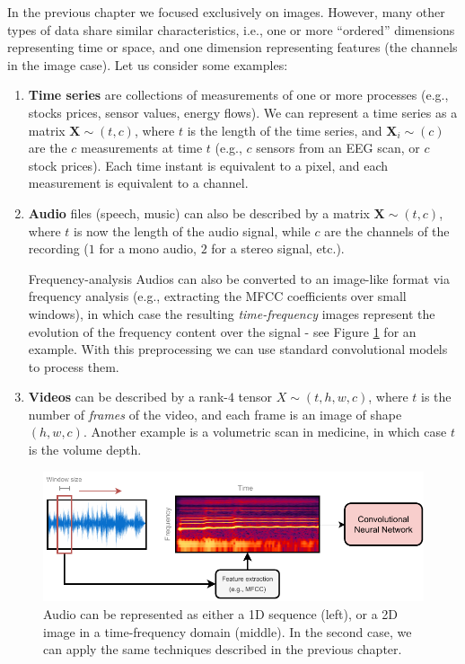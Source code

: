 In the previous chapter we focused exclusively on images. However, many other types of data share similar characteristics, i.e., one or more “ordered” dimensions representing time or space, and one dimension representing features (the channels in the image case). Let us consider some examples:
%
\begin{enumerate}
\item \textbf{Time series} are collections of measurements of one or more processes (e.g., stocks prices, sensor values, energy flows). We can represent a time series as a matrix $\mathbf{X} \sim (t,c)$, where $t$ is the length of the time series, and $\mathbf{X}_i \sim (c)$ are the $c$ measurements at time $t$ (e.g., $c$ sensors from an EEG scan, or $c$ stock prices). Each time instant is equivalent to a pixel, and each measurement is equivalent to a channel.
\item \textbf{Audio} files (speech, music) can also be described by a matrix $\mathbf{X} \sim (t,c)$, where $t$ is now the length of the audio signal, while $c$ are the channels of the recording ($1$ for a mono audio, $2$ for a stereo signal, etc.). 
%
\begin{supportbox}{Frequency-analysis}
    Audios can also be converted to an image-like format via frequency analysis (e.g., extracting the MFCC coefficients over small windows), in which case the resulting \textit{time-frequency} images represent the evolution of the frequency content over the signal - see Figure \ref{fig:audio_analysis_frequency} for an example. With this preprocessing we can use standard convolutional models to process them.
\end{supportbox}
    \item \textbf{Videos} can be described by a rank-$4$ tensor $X \sim (t, h, w, c)$, where $t$ is the number of \textit{frames} of the video, and each frame is an image of shape $(h,w,c)$. Another example is a volumetric scan in medicine, in which case $t$ is the volume depth.
\end{enumerate}

\begin{figure}
    \centering
    \includegraphics[width=1.0\textwidth]{images/audio_classification_CNN}
    \caption{Audio can be represented as either a 1D sequence (left), or a 2D image in a time-frequency domain (middle). In the second case, we can apply the same techniques described in the previous chapter.}
    \label{fig:audio_analysis_frequency}
\end{figure}

